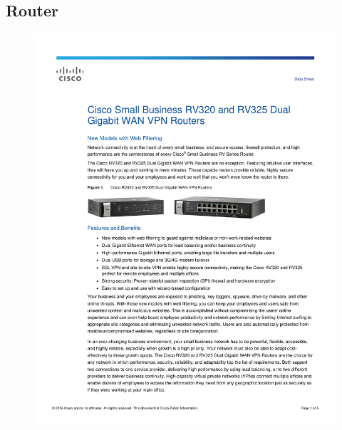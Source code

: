 \documentclass[a4paper, 12pt]{article}
\begin{document}
\subsection{Router}
\begin{figure}[H]
\centering
    \includegraphics[scale=0.80]{spec/router.pdf}%
    \label{fig:PropProf}
\end{figure}
\end{document}
